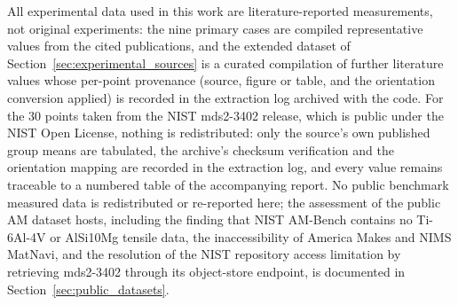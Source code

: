 \documentclass[12pt,a4paper,twocolumn]{article}
\begin{document}
All experimental data used in this work are literature-reported measurements, not original experiments: the nine primary cases are compiled representative values from the cited publications, and the extended dataset of Section~\ref{sec:experimental_sources} is a curated compilation of further literature values whose per-point provenance (source, figure or table, and the orientation conversion applied) is recorded in the extraction log archived with the code. For the 30 points taken from the NIST mds2-3402 release, which is public under the NIST Open License, nothing is redistributed: only the source's own published group means are tabulated, the archive's checksum verification and the orientation mapping are recorded in the extraction log, and every value remains traceable to a numbered table of the accompanying report. No public benchmark measured data is redistributed or re-reported here; the assessment of the public AM dataset hosts, including the finding that NIST AM-Bench contains no Ti-6Al-4V or AlSi10Mg tensile data, the inaccessibility of America Makes and NIMS MatNavi, and the resolution of the NIST repository access limitation by retrieving mds2-3402 through its object-store endpoint, is documented in Section~\ref{sec:public_datasets}.

\end{document}

